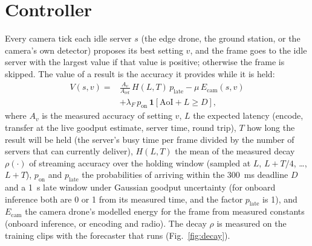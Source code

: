 \documentclass[conference]{IEEEtran}
\begin{document}
\section{Controller}\label{sec:controller}
Every camera tick each idle server $s$ (the edge drone, the ground station, or the camera's own detector) proposes its
best setting $v$, and the frame goes to the idle server with the largest value if that value is positive; otherwise
the frame is skipped. The value of a result is the accuracy it provides while it is held:
\begin{equation}
\begin{split}
V(s,v) = {} & \frac{A_v}{A_{\mathrm{ref}}}\,H(L,T)\,p_{\mathrm{late}} - \mu\,E_{\mathrm{cam}}(s,v)\\
 & + \lambda_F\,p_{\mathrm{on}}\,\mathbf{1}[\mathrm{AoI}+L\ge D],
\end{split}
\end{equation}
where $A_v$ is the measured accuracy of setting $v$, $L$ the expected latency (encode, transfer at the live goodput
estimate, server time, round trip), $T$ how long the result will be held (the server's busy time per frame divided by
the number of servers that can currently deliver), $H(L,T)$ the mean of the measured decay $\rho(\cdot)$ of streaming
accuracy over the holding window (sampled at $L$, $L+T/4$, \dots, $L+T$), $p_{\mathrm{on}}$ and $p_{\mathrm{late}}$ the
probabilities of arriving within the 300~ms deadline $D$ and a 1~s late window under Gaussian goodput uncertainty
(for onboard inference both are 0 or 1 from its measured time, and the factor $p_{\mathrm{late}}$ is 1), and
$E_{\mathrm{cam}}$ the camera drone's modelled energy for the frame from measured constants (onboard inference, or
encoding and radio). The decay $\rho$ is
measured on the training clips with the forecaster that runs (Fig.~\ref{fig:decay}).
\end{document}
